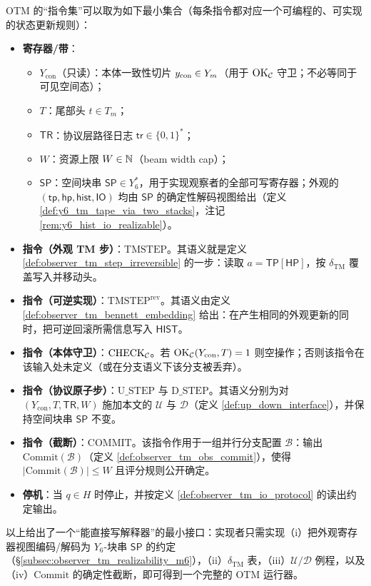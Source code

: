 \begin{definition}\label{def:observer_tm_isa}
OTM 的“指令集”可以取为如下最小集合（每条指令都对应一个可编程的、可实现的状态更新规则）：
\begin{itemize}
  \item \textbf{寄存器/带}：
  \begin{itemize}
    \item \(Y_{\mathrm{con}}\)（只读）：本体一致性切片 \(y_{\mathrm{con}}\in Y_m\)（用于 \(\mathrm{OK}_{\mathcal{C}}\) 守卫；不必等同于可见空间态）；
    \item \(T\)：尾部头 \(t\in T_m\)；
    \item \(\mathsf{TR}\)：协议层路径日志 \(\mathsf{tr}\in\{0,1\}^\ast\)；
    \item \(W\)：资源上限 \(W\in\mathbb{N}\)（beam width cap）；
    \item \(\mathsf{SP}\)：空间块串 \(\mathsf{SP}\in Y_6^\ast\)，用于实现观察者的全部可写寄存器；外观的 \((\mathsf{tp},\mathsf{hp},\mathsf{hist},\mathsf{IO})\) 均由 \(\mathsf{SP}\) 的确定性解码视图给出（定义 \ref{def:y6_tm_tape_via_two_stacks}，注记 \ref{rem:y6_hist_io_realizable}）。
  \end{itemize}
  \item \textbf{指令（外观 TM 步）}：\(\mathrm{TMSTEP}\)。其语义就是定义 \ref{def:observer_tm_step_irreversible} 的一步：读取 \(a=\mathsf{TP}[\mathsf{HP}]\)，按 \(\delta_{\mathrm{TM}}\) 覆盖写入并移动头。
  \item \textbf{指令（可逆实现）}：\(\mathrm{TMSTEP}^{\mathrm{rev}}\)。其语义由定义 \ref{def:observer_tm_bennett_embedding} 给出：在产生相同的外观更新的同时，把可逆回滚所需信息写入 \(\mathsf{HIST}\)。
  \item \textbf{指令（本体守卫）}：\(\mathrm{CHECK}_{\mathcal{C}}\)。若 \(\mathrm{OK}_{\mathcal{C}}(Y_{\mathrm{con}},T)=1\) 则空操作；否则该指令在该输入处未定义（或在分支语义下该分支被丢弃）。
  \item \textbf{指令（协议原子步）}：\(\mathrm{U\_STEP}\) 与 \(\mathrm{D\_STEP}\)。其语义分别为对 \((Y_{\mathrm{con}},T,\mathsf{TR},W)\) 施加本文的 \(\mathcal U\) 与 \(\mathcal D\)（定义 \ref{def:up_down_interface}），并保持空间块串 \(\mathsf{SP}\) 不变。
  \item \textbf{指令（截断）}：\(\mathrm{COMMIT}\)。该指令作用于一组并行分支配置 \(\mathcal B\)：输出 \(\mathrm{Commit}(\mathcal B)\)（定义 \ref{def:observer_tm_obs_commit}），使得 \(|\mathrm{Commit}(\mathcal B)|\le W\) 且评分规则公开确定。
  \item \textbf{停机}：当 \(q\in H\) 时停止，并按定义 \ref{def:observer_tm_io_protocol} 的读出约定输出。
\end{itemize}
以上给出了一个“能直接写解释器”的最小接口：实现者只需实现（i）把外观寄存器视图编码/解码为 \(Y_6\)-块串 \(\mathsf{SP}\) 的约定（\S\ref{subsec:observer_tm_realizability_m6}），（ii）\(\delta_{\mathrm{TM}}\) 表，（iii）\(\mathcal U/\mathcal D\) 例程，以及（iv）\(\mathrm{Commit}\) 的确定性截断，即可得到一个完整的 OTM 运行器。
\end{definition}

